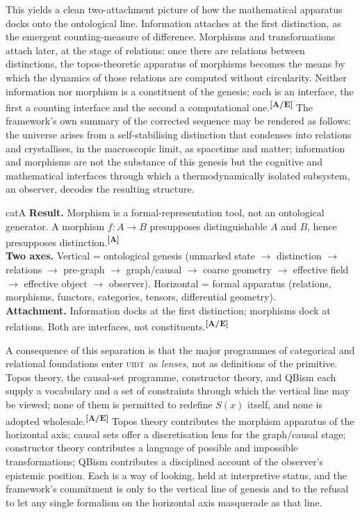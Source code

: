 \documentclass[12pt,a4paper,twoside]{article}
\theoremstyle{plain}
\theoremstyle{definition}
\theoremstyle{remark}
\newcommand{\UIDT}{\textsc{uidt}}
\newcommand{\catmark}[1]{\textsuperscript{\textsf{\textbf{[#1]}}}}
\begin{document}
This yields a clean two-attachment picture of how the mathematical apparatus docks onto the ontological line. Information attaches at the first distinction, as the emergent counting-measure of difference. Morphisms and transformations attach later, at the stage of relations: once there are relations between distinctions, the topos-theoretic apparatus of morphisms becomes the means by which the dynamics of those relations are computed without circularity. Neither information nor morphism is a constituent of the genesis; each is an interface, the first a counting interface and the second a computational one.\catmark{A/E} The framework's own summary of the corrected sequence may be rendered as follows: the universe arises from a self-stabilising distinction that condenses into relations and crystallises, in the macroscopic limit, as spacetime and matter; information and morphisms are not the substance of this genesis but the cognitive and mathematical interfaces through which a thermodynamically isolated subsystem, an observer, decodes the resulting structure.

\begin{evidencebox}{catA}
\textbf{Result.} Morphism is a formal-representation tool, not an ontological generator. A morphism $f\colon A\to B$ presupposes distinguishable $A$ and $B$,
hence presupposes distinction.\catmark{A}\\[0.3em]
\textbf{Two axes.} Vertical = ontological genesis (unmarked state $\to$ distinction $\to$ relations $\to$ pre-graph $\to$ graph/causal $\to$ coarse geometry $\to$ effective field $\to$ effective object $\to$ observer). Horizontal = formal apparatus (relations, morphisms, functors, categories,
tensors, differential geometry).\\[0.3em]
\textbf{Attachment.} Information docks at the first distinction; morphisms dock at relations. Both are interfaces, not constituents.\catmark{A/E}
\end{evidencebox}

\noindent A consequence of this separation is that the major programmes of categorical and relational foundations enter \UIDT\ as \emph{lenses}, not as definitions of the primitive. Topos theory, the causal-set programme, constructor theory, and QBism each supply a vocabulary and a set of constraints through which the vertical line may be viewed; none of them is permitted to redefine $S(x)$ itself, and none is adopted wholesale.\catmark{A/E} Topos theory contributes the morphism apparatus of the horizontal axis; causal sets offer a discretisation lens for the graph/causal stage; constructor theory contributes a language of possible and impossible transformations; QBism contributes a disciplined account of the observer's epistemic position. Each is a way of looking, held at interpretive status, and the framework's commitment is only to the vertical line of genesis and to the refusal to let any single formalism on the horizontal axis masquerade as that line.
\end{document}
